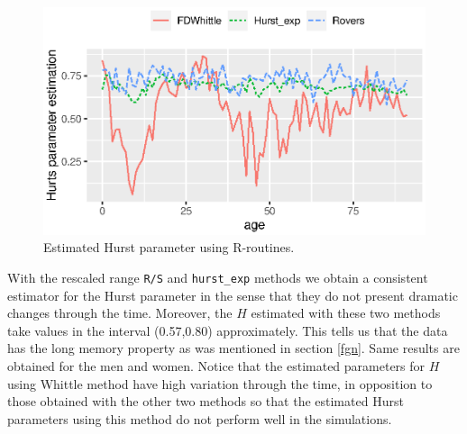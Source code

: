 \documentclass[smallextended]{svjour3}
\begin{document}
    \begin{figure}[H]
        \centering
        \includegraphics{Hurst-Women.eps}
        \caption{Estimated Hurst parameter using R-routines.}
        \label{graph-Hurst_Est_Wo}
    \end{figure}
%
        With the rescaled range \verb|R/S| and \verb|hurst_exp| methods we 
    obtain a consistent estimator for the Hurst parameter in the sense that 
    they do not present dramatic changes through the time. Moreover, the $H$ 
    estimated with these two methods take values in the interval (0.57,0.80) 
    approximately. This tells us that the data has the long memory property as
    was mentioned in section \ref{fgn}. Same results are obtained 
    for the men and women.
%
        Notice that the estimated parameters for $H$ using Whittle method have 
    high variation through the time, in opposition to those obtained with the 
    other two methods so that the estimated Hurst parameters using this method 
    do not perform well in the simulations.
\end{document}
